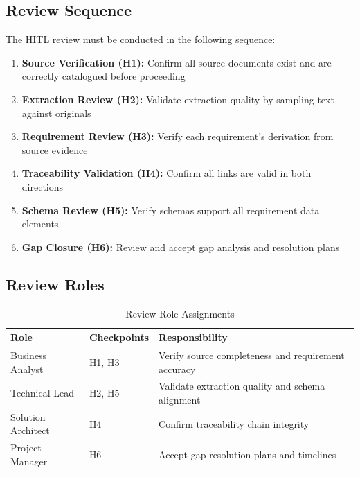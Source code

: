 \subsection{Review Sequence}

The HITL review must be conducted in the following sequence:

\begin{enumerate}
  \item \textbf{Source Verification (H1):} Confirm all source documents exist
        and are correctly catalogued before proceeding
  \item \textbf{Extraction Review (H2):} Validate extraction quality by
        sampling text against originals
  \item \textbf{Requirement Review (H3):} Verify each requirement's derivation
        from source evidence
  \item \textbf{Traceability Validation (H4):} Confirm all links are valid
        in both directions
  \item \textbf{Schema Review (H5):} Verify schemas support all requirement
        data elements
  \item \textbf{Gap Closure (H6):} Review and accept gap analysis and
        resolution plans
\end{enumerate}

\subsection{Review Roles}

\begin{table}[h]
\centering
\caption{Review Role Assignments}
\label{tab:review-roles}
\begin{tabularx}{\textwidth}{@{}L{4cm}L{3.5cm}L{6cm}@{}}
\toprule
\textbf{Role} & \textbf{Checkpoints} & \textbf{Responsibility} \\
\midrule
Business Analyst & H1, H3 & Verify source completeness and requirement accuracy \\
Technical Lead & H2, H5 & Validate extraction quality and schema alignment \\
Solution Architect & H4 & Confirm traceability chain integrity \\
Project Manager & H6 & Accept gap resolution plans and timelines \\
\bottomrule
\end{tabularx}
\end{table}

